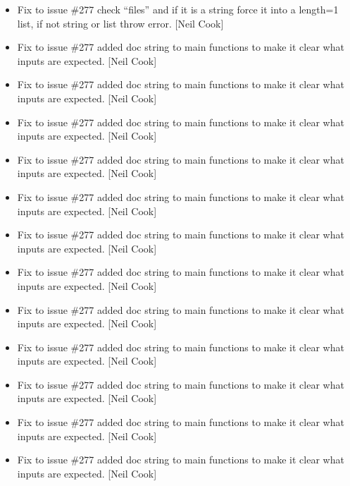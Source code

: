 \documentclass[a4paper,10pt,english]{report}
\begin{document}
\begin{itemize}
\item {} 
Fix to issue \#277 \sphinxhyphen{} check “files” and if it is a string force it into
a length=1 list, if not string or list throw error. {[}Neil Cook{]}

\item {} 
Fix to issue \#277 \sphinxhyphen{} added doc string to main functions to make it
clear what inputs are expected. {[}Neil Cook{]}

\item {} 
Fix to issue \#277 \sphinxhyphen{} added doc string to main functions to make it
clear what inputs are expected. {[}Neil Cook{]}

\item {} 
Fix to issue \#277 \sphinxhyphen{} added doc string to main functions to make it
clear what inputs are expected. {[}Neil Cook{]}

\item {} 
Fix to issue \#277 \sphinxhyphen{} added doc string to main functions to make it
clear what inputs are expected. {[}Neil Cook{]}

\item {} 
Fix to issue \#277 \sphinxhyphen{} added doc string to main functions to make it
clear what inputs are expected. {[}Neil Cook{]}

\item {} 
Fix to issue \#277 \sphinxhyphen{} added doc string to main functions to make it
clear what inputs are expected. {[}Neil Cook{]}

\item {} 
Fix to issue \#277 \sphinxhyphen{} added doc string to main functions to make it
clear what inputs are expected. {[}Neil Cook{]}

\item {} 
Fix to issue \#277 \sphinxhyphen{} added doc string to main functions to make it
clear what inputs are expected. {[}Neil Cook{]}

\item {} 
Fix to issue \#277 \sphinxhyphen{} added doc string to main functions to make it
clear what inputs are expected. {[}Neil Cook{]}

\item {} 
Fix to issue \#277 \sphinxhyphen{} added doc string to main functions to make it
clear what inputs are expected. {[}Neil Cook{]}

\item {} 
Fix to issue \#277 \sphinxhyphen{} added doc string to main functions to make it
clear what inputs are expected. {[}Neil Cook{]}

\item {} 
Fix to issue \#277 \sphinxhyphen{} added doc string to main functions to make it
clear what inputs are expected. {[}Neil Cook{]}

\end{itemize}
\end{document}
